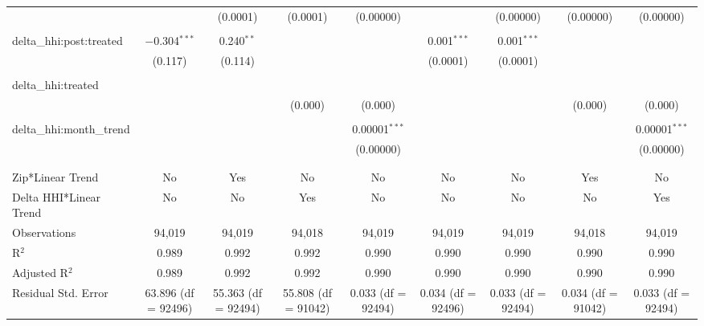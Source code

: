 \begin{table}[H]
{\begin{tabular}{@{\extracolsep{5pt}}lcccccccc}
   &  & (0.0001) & (0.0001) & (0.00000) &  & (0.00000) & (0.00000) & (0.00000) \\  

   & & & & & & & & \\  

  delta\_hhi:post:treated & $-$0.304$^{***}$ & 0.240$^{**}$ &  &  & 0.001$^{***}$ & 0.001$^{***}$ &  &  \\  

   & (0.117) & (0.114) &  &  & (0.0001) & (0.0001) &  &  \\  

   & & & & & & & & \\  

  delta\_hhi:treated &  &  &  &  &  &  &  &  \\  

   &  &  & (0.000) & (0.000) &  &  & (0.000) & (0.000) \\  

   & & & & & & & & \\  

  delta\_hhi:month\_trend &  &  &  & 0.00001$^{***}$ &  &  &  & 0.00001$^{***}$ \\  

   &  &  &  & (0.00000) &  &  &  & (0.00000) \\  

   & & & & & & & & \\  

 \hline \\[-1.8ex]  

 Zip*Linear Trend & No & Yes & No & No & No & No & Yes & No \\  

 Delta HHI*Linear Trend & No & No & Yes & No & No & No & No & Yes \\  

 Observations & 94,019 & 94,019 & 94,018 & 94,019 & 94,019 & 94,019 & 94,018 & 94,019 \\  

 R$^{2}$ & 0.989 & 0.992 & 0.992 & 0.990 & 0.990 & 0.990 & 0.990 & 0.990 \\  

 Adjusted R$^{2}$ & 0.989 & 0.992 & 0.992 & 0.990 & 0.990 & 0.990 & 0.990 & 0.990 \\  

 Residual Std. Error & 63.896 (df = 92496) & 55.363 (df = 92494) & 55.808 (df = 91042) & 0.033 (df = 92494) & 0.034 (df = 92496) & 0.033 (df = 92494) & 0.034 (df = 91042) & 0.033 (df = 92494) \\  


\end{tabular}}
\end{table}
